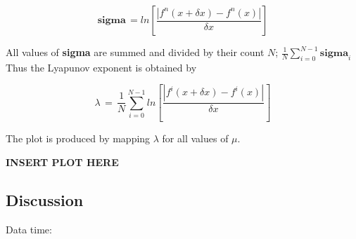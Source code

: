 $$
\textbf{sigma}\, =ln \left[ \frac{|f^n (x+\delta x) - f^n (x)|}{\delta x} \right]
$$

All values of \textbf{sigma} are summed and 
divided by their count 
$N$; $\frac{1}{N} \sum_{i=0}^{N-1} \textbf{sigma}_i$
Thus the Lyapunov exponent is obtained by

$$
\lambda \, =\, \frac{1}{N} \sum_{i=0}^{N-1} ln \left[ \frac{|f^i (x+\delta x) - f^i (x)|}{\delta x} \right]
$$

The plot is produced by mapping $\lambda$ 
for all values of $\mu$.

\textbf{INSERT PLOT HERE}
\subsection{Discussion}


Data time:

